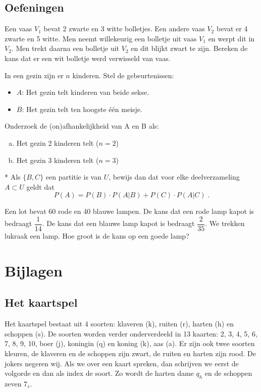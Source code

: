 \documentclass[12pt,twoside]{article}
\begin{document}
\subsection{Oefeningen}

\begin{oefening}
Een vaas $V_1$ bevat 2 zwarte en 3 witte bolletjes. Een andere vaas $V_2$ bevat er 4 zwarte
en 5 witte. Men neemt willekeurig een bolletje uit vaas $V_1$ en werpt dit in $V_2$. Men
trekt daarna een bolletje uit $V_2$ en dit blijkt zwart te zijn. Bereken de kans dat er een
wit bolletje werd verwisseld van vaas.
\end{oefening}

\begin{oefening}
In een gezin zijn er $n$ kinderen. Stel de gebeurtenissen:
\begin{itemize}
  \item $A$: Het gezin telt kinderen van beide sekse.
  \item $B$: Het gezin telt ten hoogste één meisje.
\end{itemize}
	Onderzoek de (on)afhankelijkheid van A en B als:
\begin{enumerate}[(a)]
  \item Het gezin 2 kinderen telt ($n = 2$)
  \item Het gezin 3 kinderen telt ($n = 3$)
\end{enumerate}
\end{oefening}

\begin{oefening}*
Als $\{B,C\}$ een partitie is van $U$, bewijs dan dat voor elke deelverzameling $A\subset U$ geldt dat
$$P(A)=P(B)\cdot P(A|B)+P(C)\cdot P(A|C)\;.$$
\end{oefening}

\begin{oefening}
Een lot bevat 60 rode en 40 blauwe lampen. De kans dat een rode lamp kapot is bedraagt $\dfrac{1}{14}$. De kans dat een blauwe lamp kapot is bedraagt $\dfrac{2}{35}$. We trekken lukraak een lamp. Hoe groot is de kans op een goede lamp?
\end{oefening}

\newpage
\appendix
\section*{Bijlagen}

\subsection*{Het kaartspel}
Het kaartspel bestaat uit 4 soorten: klaveren (k), ruiten (r), harten (h) en schoppen (s). De soorten worden verder onderverdeeld in 13 kaarten: 2, 3, 4, 5, 6, 7, 8, 9, 10, boer (j), koningin (q) en koning (k), aas (a). Er zijn ook twee soorten kleuren, de klaveren en de schoppen zijn zwart, de ruiten en harten zijn rood. De jokers negeren wij. Als we over een kaart spreken, dan schrijven we eerst de volgorde en dan als index de soort. Zo wordt de harten dame $q_h$ en de schoppen zeven $7_s$.
\end{document}
